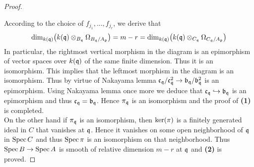 \begin{proof}
\begin{center}
\end{center}
According to the choice of $f_{j_1},...,f_{j_r}$, we derive that
$$\mathrm{dim}_{k(\mathfrak{q})}\big(k(\mathfrak{q})\otimes_{B_{\mathfrak{q}}}\Omega_{B_{\mathfrak{q}}/A_{\mathfrak{p}}}\big) = m - r = \mathrm{dim}_{k(\mathfrak{q})}\big(k(\mathfrak{q})\otimes_{C_{\mathfrak{q}}}\Omega_{C_{\mathfrak{q}}/A_{\mathfrak{p}}}\big)$$
In particular, the rightmost vertical morphism in the diagram is an epimorphism of vector spaces over $k(\mathfrak{q})$ of the same finite dimension. Thus it is an isomorphism. This implies that the leftmost morphism in the diagram is an isomorphism. Thus by virtue of Nakayama lemma $\mathfrak{c}_{\mathfrak{q}}/\mathfrak{c}^2_{\mathfrak{q}}\rightarrow \mathfrak{b}_{\mathfrak{q}}/\mathfrak{b}^2_{\mathfrak{q}}$ is an epimorphism. Using Nakayama lemma once more we deduce that $\mathfrak{c}_{\mathfrak{q}} \hookrightarrow \mathfrak{b}_{\mathfrak{q}}$ is an epimorphism and thus $\mathfrak{c}_{\mathfrak{q}} = \mathfrak{b}_{\mathfrak{q}}$. Hence $\pi_{\mathfrak{q}}$ is an isomorphism and the proof of \textbf{(1)} is completed.\\
On the other hand if $\pi_{\mathfrak{q}}$ is an isomorphism, then $\mathrm{ker}(\pi)$ is a finitely generated ideal in $C$ that vanishes at $\mathfrak{q}$. Hence it vanishes on some open neighborhood of $\mathfrak{q}$ in $\mathrm{Spec}\, C$ and thus $\mathrm{Spec}\, \pi$ is an isomorphism on that neighborhood. Thus $\mathrm{Spec}\, B\rightarrow \mathrm{Spec}\, A$ is smooth of relative dimension $m-r$ at $\mathfrak{q}$ and \textbf{(2)} is proved.
\end{proof}

